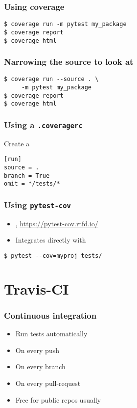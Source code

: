 \documentclass[14pt,compress]{beamer}
\begin{document}
\begin{frame}[fragile]
  \frametitle{Using coverage}
  \begin{lstlisting}
$ coverage run -m pytest my_package
$ coverage report
$ coverage html
  \end{lstlisting}%
\end{frame}

\begin{frame}[fragile]
  \frametitle{Narrowing the source to look at}
  \begin{lstlisting}
$ coverage run --source . \
     -m pytest my_package
$ coverage report
$ coverage html
  \end{lstlisting}%
\end{frame}

\begin{frame}[fragile]
  \frametitle{Using a \texttt{.coveragerc}}
  Create a 
  \begin{lstlisting}
[run]
source = .
branch = True
omit = */tests/*
  \end{lstlisting}
\end{frame}

\begin{frame}
  \frametitle{Using \texttt{pytest-cov}}
  \begin{itemize}
  \item {}, \url{https://pytest-cov.rtfd.io/}
  \item Integrates directly with 
  \end{itemize}
\begin{lstlisting}
$ pytest --cov=myproj tests/
\end{lstlisting}
\end{frame}


\section{Travis-CI}

\begin{frame}
  \frametitle{Continuous integration}
  \begin{itemize}
  \item Run tests automatically
  \item On every push
  \item On every branch
  \item On every pull-request
  \item Free for public repos usually
  \end{itemize}
\end{frame}
\end{document}
